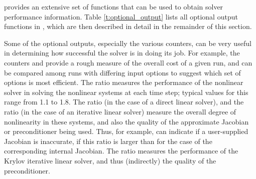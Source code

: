 {\cvode} provides an extensive set of functions that can be used to obtain
solver performance information.
Table \ref{t:optional_output} lists all optional output functions in {\cvode},
which are then described in detail in the remainder of this section.

Some of the optional outputs, especially the various counters, can be
very useful in determining how successful the {\cvode} solver is in
doing its job.  For example, the counters  and 
provide a rough measure of the overall cost of a given run, and can be
compared among runs with differing input options to suggest which set
of options is most efficient.  The ratio  measures
the performance of the nonlinear solver in solving the nonlinear
systems at each time step; typical values for this range from 1.1 to
1.8.  The ratio  (in the case of a direct linear
solver), and the ratio  (in the case of an
iterative linear solver) measure the overall degree of nonlinearity
in these systems, and also the quality of the approximate Jacobian or
preconditioner being used.  Thus, for example, 
can indicate if a user-supplied Jacobian is inaccurate, if this ratio
is larger than for the case of the corresponding internal Jacobian.
The ratio  measures the performance of the Krylov
iterative linear solver, and thus (indirectly) the quality of the
preconditioner.

\vspace*{.2in}

\newlength{\colAA}
\settowidth{\colAA}{No. of r.h.s. calls for finite diff. Jacobian-vector evals.}
\newlength{\colBB}



